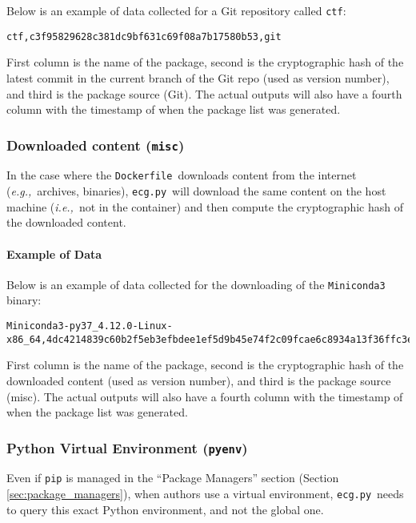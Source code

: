 \documentclass{article}
\newcommand{\dfile}{\texttt{Dockerfile}}
\newcommand{\ecg}{\texttt{ecg.py}}
\newcommand{\eg}{\emph{e.g.,}}
\newcommand{\ie}{\emph{i.e.,}}
\begin{document}
Below is an example of data collected for a Git repository called \texttt{ctf}:

\begin{lstlisting}
ctf,c3f95829628c381dc9bf631c69f08a7b17580b53,git
\end{lstlisting}

First column is the name of the package, second is the cryptographic hash of the latest commit in the current branch of the Git repo (used as version number), and third is the package source (Git). The actual outputs will also have a fourth column with the timestamp of when the package list was generated.

\subsubsection{Downloaded content (\texttt{misc})}\label{sec:misc}

In the case where the \dfile\ downloads content from the internet (\eg\ archives, binaries), \ecg\ will download the same content on the host machine (\ie\ not in the container) and then compute the cryptographic hash of the downloaded content.

\paragraph{Example of Data}

Below is an example of data collected for the downloading of the \texttt{Miniconda3} binary:

\begin{lstlisting}
Miniconda3-py37_4.12.0-Linux-x86_64,4dc4214839c60b2f5eb3efbdee1ef5d9b45e74f2c09fcae6c8934a13f36ffc3e,misc
\end{lstlisting}

First column is the name of the package, second is the cryptographic hash of the downloaded content (used as version number), and third is the package source (misc). The actual outputs will also have a fourth column with the timestamp of when the package list was generated.

\subsubsection{Python Virtual Environment (\texttt{pyenv})}\label{sec:pyenv}

Even if \texttt{pip} is managed in the ``Package Managers'' section (Section \ref{sec:package_managers}), when authors use a virtual environment, \ecg\ needs to query this exact Python environment, and not the global one.
\end{document}
